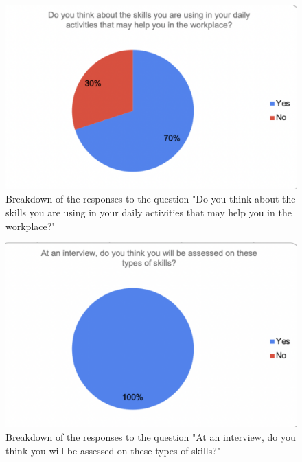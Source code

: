 \documentclass{l4proj}
\begin{document}
\begin{appendices}
\begin{figure}[H]
    \begin{centering}
    \includegraphics[scale=0.5]{images/GradAttr-6.pdf}
    \caption{Breakdown of the responses to the question "Do you think about the skills you are using in your daily activities that may help you in the workplace?"}
    \label{fig: GradAttr-6}
    \end{centering}
\end{figure}

\begin{figure}[H]
    \begin{centering}
    \includegraphics[scale=0.5]{images/GradAttr-7.pdf}
    \caption{Breakdown of the responses to the question "At an interview, do you think you will be assessed on these types of skills?"}
    \label{fig: GradAttr-7}
    \end{centering}
\end{figure}


\end{appendices}
\end{document}

